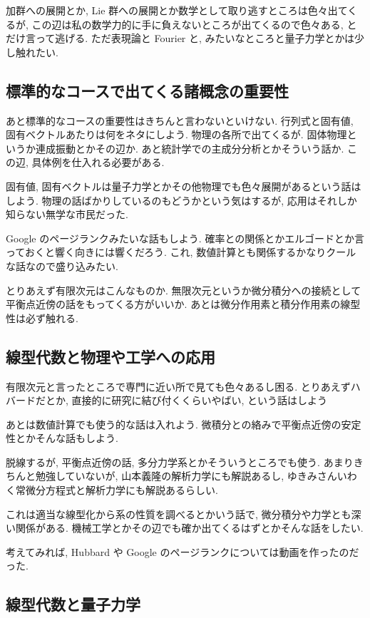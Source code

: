 \documentclass[openany, a4paper, oneside]{jsbook}
\theoremstyle{break}
\theoremstyle{breakdefn}
\begin{document}
加群への展開とか, Lie 群への展開とか数学として取り逃すところは色々出てくるが,
この辺は私の数学力的に手に負えないところが出てくるので色々ある, とだけ言って逃げる.
ただ表現論と Fourier と, みたいなところと量子力学とかは少し触れたい.
\subsection{標準的なコースで出てくる諸概念の重要性}


あと標準的なコースの重要性はきちんと言わないといけない.
行列式と固有値, 固有ベクトルあたりは何をネタにしよう.
物理の各所で出てくるが. 固体物理というか連成振動とかその辺か.
あと統計学での主成分分析とかそういう話か.
この辺, 具体例を仕入れる必要がある.

固有値, 固有ベクトルは量子力学とかその他物理でも色々展開があるという話はしよう.
物理の話ばかりしているのもどうかという気はするが, 応用はそれしか知らない無学な市民だった.

Google のページランクみたいな話もしよう.
確率との関係とかエルゴードとか言っておくと響く向きには響くだろう.
これ, 数値計算とも関係するかなりクールな話なので盛り込みたい.

とりあえず有限次元はこんなものか.
無限次元というか微分積分への接続として平衡点近傍の話をもってくる方がいいか.
あとは微分作用素と積分作用素の線型性は必ず触れる.
\subsection{線型代数と物理や工学への応用}


有限次元と言ったところで専門に近い所で見ても色々あるし困る.
とりあえずハバードだとか, 直接的に研究に結び付くくらいやばい, という話はしよう

あとは数値計算でも使う的な話は入れよう.
微積分との絡みで平衡点近傍の安定性とかそんな話もしよう.

脱線するが, 平衡点近傍の話, 多分力学系とかそういうところでも使う.
あまりきちんと勉強していないが, 山本義隆の解析力学にも解説あるし,
ゆきみさんいわく常微分方程式と解析力学にも解説あるらしい.

これは適当な線型化から系の性質を調べるとかいう話で, 微分積分や力学とも深い関係がある.
機械工学とかその辺でも確か出てくるはずとかそんな話をしたい.

考えてみれば, Hubbard や Google のページランクについては動画を作ったのだった.
\subsection{線型代数と量子力学}
\end{document}

